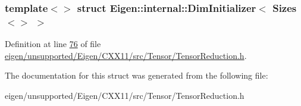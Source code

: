 \subsubsection*{template$<$$>$\newline
struct Eigen\+::internal\+::\+Dim\+Initializer$<$ Sizes$<$$>$ $>$}



Definition at line \hyperlink{eigen_2unsupported_2_eigen_2_c_x_x11_2src_2_tensor_2_tensor_reduction_8h_source_l00076}{76} of file \hyperlink{eigen_2unsupported_2_eigen_2_c_x_x11_2src_2_tensor_2_tensor_reduction_8h_source}{eigen/unsupported/\+Eigen/\+C\+X\+X11/src/\+Tensor/\+Tensor\+Reduction.\+h}.



The documentation for this struct was generated from the following file\+:\begin{DoxyCompactItemize}
\item 
eigen/unsupported/\+Eigen/\+C\+X\+X11/src/\+Tensor/\+Tensor\+Reduction.\+h\end{DoxyCompactItemize}
